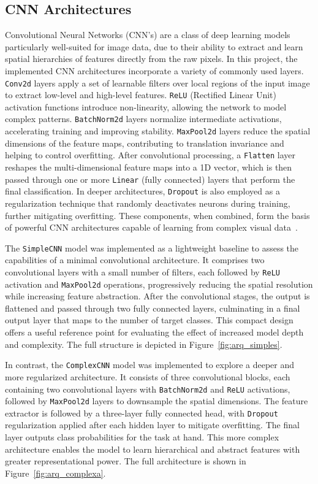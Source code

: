 \documentclass[journal,article,submit,pdftex,moreauthors]{Definitions/mdpi}
\begin{document}
\subsection{CNN Architectures}
Convolutional Neural Networks (CNN's) are a class of deep learning models particularly well-suited for image data, due to their ability to extract and learn spatial hierarchies of features directly from the raw pixels. In this project, the implemented CNN architectures incorporate a variety of commonly used layers. \texttt{Conv2d} layers apply a set of learnable filters over local regions of the input image to extract low-level and high-level features. \texttt{ReLU} (Rectified Linear Unit) activation functions introduce non-linearity, allowing the network to model complex patterns. \texttt{BatchNorm2d} layers normalize intermediate activations, accelerating training and improving stability. \texttt{MaxPool2d} layers reduce the spatial dimensions of the feature maps, contributing to translation invariance and helping to control overfitting. After convolutional processing, a \texttt{Flatten} layer reshapes the multi-dimensional feature maps into a 1D vector, which is then passed through one or more \texttt{Linear} (fully connected) layers that perform the final classification. In deeper architectures, \texttt{Dropout} is also employed as a regularization technique that randomly deactivates neurons during training, further mitigating overfitting. These components, when combined, form the basis of powerful CNN architectures capable of learning from complex visual data~\cite{gfg_cnn_intro}.

The \texttt{SimpleCNN} model was implemented as a lightweight baseline to assess the capabilities of a minimal convolutional architecture. It comprises two convolutional layers with a small number of filters, each followed by \texttt{ReLU} activation and \texttt{MaxPool2d} operations, progressively reducing the spatial resolution while increasing feature abstraction. After the convolutional stages, the output is flattened and passed through two fully connected layers, culminating in a final output layer that maps to the number of target classes. This compact design offers a useful reference point for evaluating the effect of increased model depth and complexity. The full structure is depicted in Figure~\ref{fig:arq_simples}.

In contrast, the \texttt{ComplexCNN} model was implemented to explore a deeper and more regularized architecture. It consists of three convolutional blocks, each containing two convolutional layers with \texttt{BatchNorm2d} and \texttt{ReLU} activations, followed by \texttt{MaxPool2d} layers to downsample the spatial dimensions. The feature extractor is followed by a three-layer fully connected head, with \texttt{Dropout} regularization applied after each hidden layer to mitigate overfitting. The final layer outputs class probabilities for the task at hand. This more complex architecture enables the model to learn hierarchical and abstract features with greater representational power. The full architecture is shown in Figure~\ref{fig:arq_complexa}.
\end{document}
